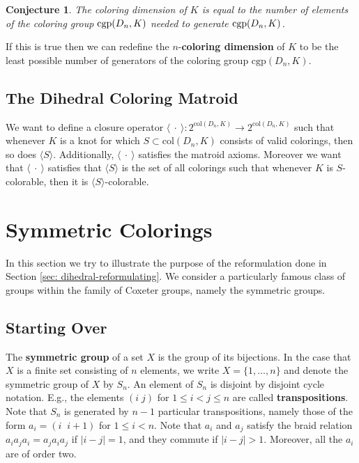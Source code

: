 \documentclass{article}
\newtheorem{conjecture}[theorem]{Conjecture}
\theoremstyle{definition}
\begin{document}
\begin{conjecture}
The coloring dimension of $K$ is equal to the number of elements of the coloring group $\textup{cgp}(D_n, K)$ needed to generate $\textup{cgp}(D_n,K)$.
\end{conjecture}


If this is true then we can redefine the $n$-\textbf{coloring dimension} of $K$ to be the least possible number of generators of the coloring group $\text{cgp}(D_n,K)$.

\subsection{The Dihedral Coloring Matroid}
We want to define a closure operator $\langle \: \cdot \: \rangle : 2^{\text{col}(D_n, K)} \rightarrow 2^{\text{col}(D_n, K)}$ such that whenever $K$ is a knot for which $S \subset \text{col}(D_n, K)$ consists of valid colorings, then so does $\langle S \rangle$. Additionally, $\langle \: \cdot \: \rangle$ satisfies the matroid axioms. Moreover we want that $\langle \: \cdot \: \rangle$ satisfies that $\langle S \rangle$ is the set of all colorings such that whenever $K$ is $S$-colorable, then it is $\langle S \rangle$-colorable.

\section{Symmetric Colorings}
In this section we try to illustrate the purpose of the reformulation done in Section \ref{sec: dihedral-reformulating}. We consider a particularly famous class of groups within the family of Coxeter groups, namely the symmetric groups.

\subsection{Starting Over}
The \textbf{symmetric group} of a set $X$ is the group of its bijections. In the case that $X$ is a finite set consisting of $n$ elements, we write $X = \{1, \dots, n\}$ and denote the symmetric group of $X$ by $S_n$. An element of $S_n$ is disjoint by disjoint cycle notation. E.g., the elements $(i \; j)$ for $1 \leq i < j \leq n$ are called \textbf{transpositions}. Note that $S_n$ is generated by $n-1$ particular transpositions, namely those of the form $a_i = (i \;\; i + 1)$ for $1 \leq i < n$. Note that $a_i$ and $a_j$ satisfy the braid relation $a_ia_ja_i=a_ja_ia_j$ if $|i - j| = 1$, and they commute if $|i - j| > 1$. Moreover, all the $a_i$ are of order two.
\end{document}
